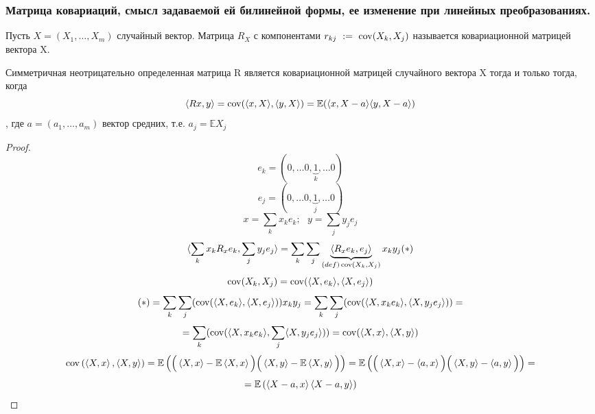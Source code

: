     \subsubsection{Матрица ковариаций, смысл задаваемой ей билинейной формы, ее изменение при линейных преобразованиях. }
    \begin{definition}
        Пусть $ X = (X_1,\ldots, X_m) $ случайный вектор. Матрица $ R_X $ с компонентами $ r_{kj}~:=~\operatorname{cov}(X_k, X_j ) $ называется ковариационной матрицей вектора X.
    \end{definition}
    \begin{theorem}
        Симметричная неотрицательно определенная матрица R является ковариационной матрицей случайного вектора X тогда и только тогда, когда
        $$\langle Rx, y\rangle = \operatorname{cov}(\langle x, X\rangle, \langle y, X\rangle) = \mathbb{E}(\langle x, X - a\rangle \langle y, X - a\rangle)$$
        , где $ a = (a_1, \ldots, a_m) $ вектор средних, т.е. $ a_j = \mathbb{E}X_j $
    \end{theorem}
    \begin{proof}
        \text{ }\\
        \[e_k = (0, \ldots 0, \underbrace{1}_k, \ldots 0) \]
        \[e_j = (0, \ldots 0, \underbrace{1}_j, \ldots 0) \]
        \[x = \sum_{k}x_ke_k;\text{ }y = \sum_{j} y_je_j \]
        \[\langle \sum_{k}x_kR_x e_k, \sum_j y_je_j \rangle = \sum_{k}\sum_j\underbrace{\langle R_x e_k ,e_j\rangle}_{(def)\operatorname{cov}(X_k, X_j)} x_ky_j (*)\]
        \[\operatorname{cov}(X_k, X_j) = \operatorname{cov}(\langle X, e_k\rangle, \langle X,e_j\rangle)\]
        \[ (*) =\sum_{k}\sum_j(\operatorname{cov}(\langle X , e_k\rangle, \langle X, e_j\rangle)) x_ky_j = \sum_{k}\sum_j( \operatorname{cov}(\langle X, x_ke_k\rangle, \langle X, y_je_j\rangle)) =\]
        \[ =  \sum_{k}( \operatorname{cov}(\langle X, x_ke_k\rangle, \sum_j\langle X, y_je_j\rangle)) = \operatorname{cov}(\langle X, x\rangle, \langle X, y\rangle)\]
        \[ \operatorname{cov} \left( \left\langle X, x \right\rangle, \left\langle X, y \right\rangle \right) = 
        \mathbb{E} \left( 
            \Big( \left\langle X, x \right\rangle - \mathbb{E} \left\langle X, x \right\rangle \Big)  
            \Big( \left\langle X, y \right\rangle - \mathbb{E} \left\langle X, y \right\rangle \Big)  
        \right) = 
        \mathbb{E} \left( 
            \Big( \left\langle X, x \right\rangle - \left\langle a, x \right\rangle \Big)  
            \Big( \left\langle X, y \right\rangle - \left\langle a, y \right\rangle \Big)  
    \right) = \]
        \[ = \mathbb{E} \left( 
            \left\langle X - a , x \right\rangle
            \left\langle X - a, y \right\rangle 
        \right)
        \] 
    \end{proof}
